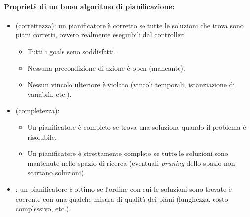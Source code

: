 
\paragraph{Proprietà di un buon algoritmo di pianificazione:}

\begin{itemize}
  \item {} (correttezza): un pianificatore è corretto se tutte le soluzioni che trova sono piani corretti, ovvero realmente eseguibili dal controller: 
    \begin{itemize}
      \item Tutti i goals sono soddisfatti. 
      \item Nessuna precondizione di azione è open (mancante). 
      \item Nessun vincolo ulteriore è violato (vincoli temporali, istanziazione di variabili, etc.). 
    \end{itemize}
  \item {} (completezza): 
    \begin{itemize}
      \item Un pianificatore è completo se trova una soluzione quando il problema è risolubile. 
      \item Un pianificatore è strettamente completo se tutte le soluzioni sono mantenute nello spazio di ricerca (eventuali \textit{pruning} dello spazio non scartano soluzioni).
    \end{itemize}
  \item {}: un pianificatore è ottimo se l'ordine con cui le soluzioni sono trovate è coerente con una qualche misura di qualità dei piani (lunghezza, costo complessivo, etc.).
\end{itemize}


